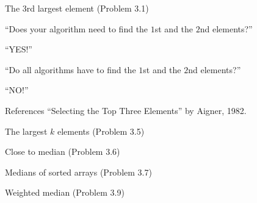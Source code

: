 \begin{frame}{The 3rd largest element (Problem 3.1)}
  \begin{center}
	``Does your algorithm need to find the $1$st and the $2$nd elements?'' \\[0.30cm] \pause

	``YES!''
  \end{center}

  \pause
  \begin{center}
	``Do all algorithms have to find the $1$st and the $2$nd elements?'' \\[0.30cm] \pause

	``NO!''
  \end{center}

  \pause
  \begin{alertblock}{References}
	``Selecting the Top Three Elements'' by Aigner, 1982.
  \end{alertblock}


\end{frame}
\begin{frame}{The largest $k$ elements (Problem 3.5)}

\end{frame}
\begin{frame}{Close to median (Problem 3.6)}
\end{frame}
\begin{frame}{Medians of sorted arrays (Problem 3.7)}

\end{frame}
\begin{frame}{Weighted median (Problem 3.9)}
\end{frame}

